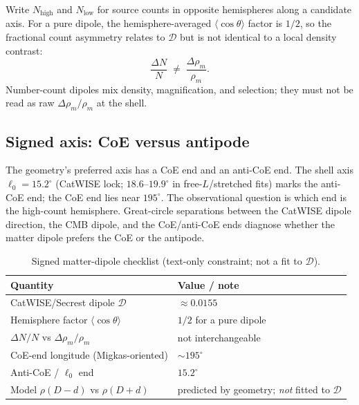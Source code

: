 \documentclass[11pt,a4paper]{article}
\begin{document}
Write \(N_{\mathrm{high}}\) and \(N_{\mathrm{low}}\) for source counts in opposite hemispheres along a candidate axis. For a pure dipole, the hemisphere-averaged \(\langle\cos\theta\rangle\) factor is \(1/2\), so the fractional count asymmetry relates to \(\mathcal{D}\) but is not identical to a local density contrast:
\begin{equation}
\frac{\Delta N}{N}\;\neq\;\frac{\Delta\rho_m}{\rho_m}.
\end{equation}
Number-count dipoles mix density, magnification, and selection; they must not be read as raw \(\Delta\rho_m/\rho_m\) at the shell.

\subsection{Signed axis: CoE versus antipode}

The geometry's preferred axis has a CoE end and an anti-CoE end. The shell axis \(\ell_0=15.2^\circ\) (CatWISE lock; \(18.6\)--\(19.9^\circ\) in free-\(L\)/stretched fits) marks the anti-CoE end; the CoE end lies near \(195^\circ\). The observational question is which end is the high-count hemisphere. Great-circle separations between the CatWISE dipole direction, the CMB dipole, and the CoE/anti-CoE ends diagnose whether the matter dipole prefers the CoE or the antipode.

\begin{table}[t]
\centering
\caption{Signed matter-dipole checklist (text-only constraint; not a fit to \(\mathcal{D}\)).}
\label{tab:matterdipole}
\begin{tabular}{@{}ll@{}}
\toprule
Quantity & Value / note \\
\midrule
CatWISE/Secrest dipole \(\mathcal{D}\) & \(\approx0.0155\) \\
Hemisphere factor \(\langle\cos\theta\rangle\) & \(1/2\) for a pure dipole \\
\(\Delta N/N\) vs \(\Delta\rho_m/\rho_m\) & not interchangeable \\
CoE-end longitude (Migkas-oriented) & \(\sim195^\circ\) \\
Anti-CoE / \(\ell_0\) end & \(15.2^\circ\) \\
Model \(\rho(D-d)\) vs \(\rho(D+d)\) & predicted by geometry; \emph{not} fitted to \(\mathcal{D}\) \\
\bottomrule
\end{tabular}
\end{table}
\end{document}
